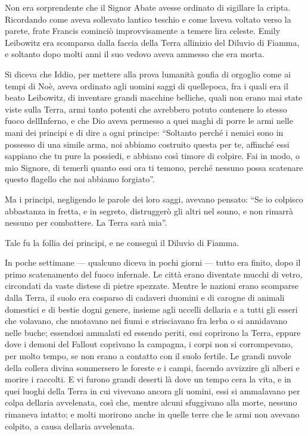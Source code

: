 Non era sorprendente che il Signor Abate avesse ordinato di sigillare la
cripta. Ricordando come aveva sollevato l\textquotesingle antico teschio
e come l\textquotesingle aveva voltato verso la parete, frate Francis
cominciò improvvisamente a temere l\textquotesingle ira celeste. Emily
Leibowitz era scomparsa dalla faccia della Terra
all\textquotesingle inizio del Diluvio di Fiamma, e soltanto dopo molti
anni il suo vedovo aveva ammesso che era morta.

Si diceva che Iddio, per mettere alla prova l\textquotesingle umanità
gonfia di orgoglio come ai tempi di Noè, aveva ordinato agli uomini
saggi di quell\textquotesingle epoca, fra i quali era il beato
Leibowitz, di inventare grandi macchine belliche, quali non erano mai
state viste sulla Terra, armi tanto potenti che avrebbero potuto
contenere lo stesso fuoco dell\textquotesingle Inferno, e che Dio aveva
permesso a quei maghi di porre le armi nelle mani dei principi e di dire
a ogni principe: ``Soltanto perché i nemici sono in possesso di una
simile arma, noi abbiamo costruito questa per te, affinché essi sappiano
che tu pure la possiedi, e abbiano così timore di colpire. Fai in modo,
o mio Signore, di temerli quanto essi ora ti temono, perché nessuno
possa scatenare questo flagello che noi abbiamo forgiato''.

Ma i principi, negligendo le parole dei loro saggi, avevano pensato:
``Se io colpisco abbastanza in fretta, e in segreto, distruggerò gli
altri nel sonno, e non rimarrà nessuno per combattere. La Terra sarà
mia''.

Tale fu la follia dei principi, e ne conseguì il Diluvio di Fiamma.

In poche settimane --- qualcuno diceva in pochi giorni --- tutto era
finito, dopo il primo scatenamento del fuoco infernale. Le città erano
diventate mucchi di vetro, circondati da vaste distese di pietre
spezzate. Mentre le nazioni erano scomparse dalla Terra, il suolo era
cosparso di cadaveri d\textquotesingle uomini e di carogne di animali
domestici e di bestie d\textquotesingle ogni genere, insieme agli
uccelli dell\textquotesingle aria e a tutti gli esseri che volavano, che
nuotavano nei fiumi e strisciavano fra l\textquotesingle erba o si
annidavano nelle buche; essendosi ammalati ed essendo periti, essi
coprirono la Terra, eppure dove i demoni del Fallout coprivano la
campagna, i corpi non si corrompevano, per molto tempo, se non erano a
contatto con il suolo fertile. Le grandi nuvole della collera divina
sommersero le foreste e i campi, facendo avvizzire gli alberi e morire i
raccolti. E vi furono grandi deserti là dove un tempo
c\textquotesingle era la vita, e in quei luoghi della Terra in cui
vivevano ancora gli uomini, essi si ammalavano per colpa
dell\textquotesingle aria avvelenata, così che, mentre alcuni sfuggivano
alla morte, nessuno rimaneva intatto; e molti morirono anche in quelle
terre che le armi non avevano colpito, a causa dell\textquotesingle aria
avvelenata.

